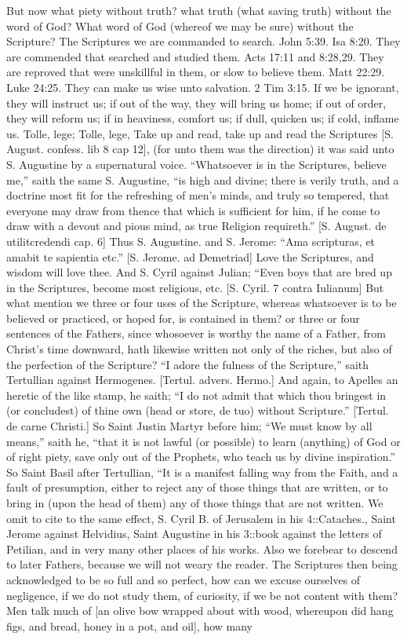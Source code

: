 {\par }{\IP But now what piety without truth? what truth (what saving truth) without the word of God? What word of God (whereof we may be sure) without the Scripture? The Scriptures we are commanded to search. John 5:39. Isa 8:20. They are commended that searched and studied them. Acts 17:11 and 8:28,29. They are reproved that were unskillful in them, or slow to believe them. Matt 22:29. Luke 24:25. They can make us wise unto salvation. 2 Tim 3:15. If we be ignorant, they will instruct us; if out of the way, they will bring us home; if out of order, they will reform us; if in heaviness, comfort us; if dull, quicken us; if cold, inflame us. Tolle, lege; Tolle, lege, Take up and read, take up and read the Scriptures [S. August. confess. lib 8 cap 12], (for unto them was the direction) it was said unto S. Augustine by a supernatural voice. “Whatsoever is in the Scriptures, believe me,” saith the same S. Augustine, “is high and divine; there is verily truth, and a doctrine most fit for the refreshing of men’s minds, and truly so tempered, that everyone may draw from thence that which is sufficient for him, if he come to draw with a devout and pious mind, as true Religion requireth.” [S. August. de utilitcredendi cap. 6] Thus S. Augustine. and S. Jerome: “Ama scripturas, et amabit te sapientia etc.” [S. Jerome. ad Demetriad] Love the Scriptures, and wisdom will love thee. And S. Cyril against Julian; “Even boys that are bred up in the Scriptures, become most religious, etc. [S. Cyril. 7 contra Iulianum] But what mention we three or four uses of the Scripture, whereas whatsoever is to be believed or practiced, or hoped for, is contained in them? or three or four sentences of the Fathers, since whosoever is worthy the name of a Father, from Christ’s time downward, hath likewise written not only of the riches, but also of the perfection of the Scripture? “I adore the fulness of the Scripture,” saith Tertullian against Hermogenes. [Tertul. advers. Hermo.] And again, to Apelles an heretic of the like stamp, he saith; “I do not admit that which thou bringest in (or concludest) of thine own (head or store, de tuo) without Scripture.” [Tertul. de carne Christi.] So Saint Justin Martyr before him; “We must know by all means,” saith he, “that it is not lawful (or possible) to learn (anything) of God or of right piety, save only out of the Prophets, who teach us by divine inspiration.” So Saint Basil after Tertullian, “It is a manifest falling way from the Faith, and a fault of presumption, either to reject any of those things that are written, or to bring in (upon the head of them) any of those things that are not written. We omit to cite to the same effect, S. Cyril B. of Jerusalem in his 4::Cataches., Saint Jerome against Helvidius, Saint Augustine in his 3::book against the letters of Petilian, and in very many other places of his works. Also we forebear to descend to later Fathers, because we will not weary the reader. The Scriptures then being acknowledged to be so full and so perfect, how can we excuse ourselves of negligence, if we do not study them, of curiosity, if we be not content with them? Men talk much of [an olive bow wrapped about with wood, whereupon did hang figs, and bread, honey in a pot, and oil], how many }

